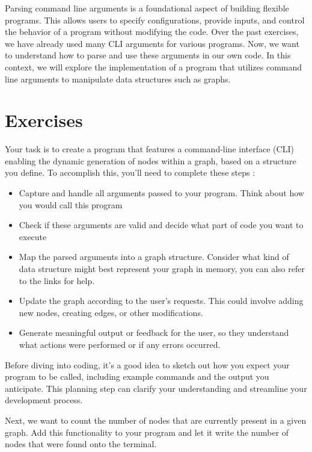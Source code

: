 \documentclass{dcbl/challenge}
\begin{document}
Parsing command line arguments is a foundational aspect of building flexible programs. This allows users to specify configurations, provide inputs, and control the behavior of a program without modifying the code.  Over the past exercises, we have already used many CLI arguments for various programs. 
Now, we want to understand how to parse and use these arguments in our own code. In this context, we will explore the implementation of a program that utilizes command line arguments to manipulate data structures such as graphs.

\section*{Exercises}
\begin{aufgabe}
    Your task is to create a program that features a command-line interface (CLI) enabling the dynamic generation of nodes within a graph, based on a structure you define. To accomplish this, you'll need to complete these steps :
    \begin{itemize}
        \item Capture and handle all arguments passed to your program. Think about how you would call this program
        \item Check if these arguments are valid and decide what part of code you want to execute
        \item Map the parsed arguments into a graph structure. Consider what kind of data structure might best represent your graph in memory, you can also refer to the links for help.
        \item Update the graph according to the user's requests. This could involve adding new nodes, creating edges, or other modifications.
        \item Generate meaningful output or feedback for the user, so they understand what actions were performed or if any errors occurred.
    \end{itemize}
Before diving into coding, it's a good idea to sketch out how you expect your program to be called, including example commands and the output you anticipate. This planning step can clarify your understanding and streamline your development process.
\end{aufgabe}

\begin{aufgabe}
    Next, we want to count the number of nodes that are currently present in a given graph. Add this functionality to your program and let it write the number of nodes that were found onto the terminal.
    
\end{aufgabe}
\end{document}
